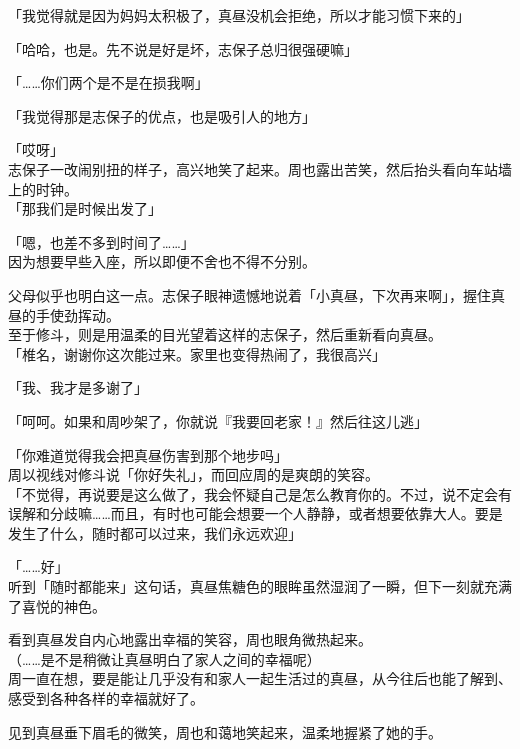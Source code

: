 「我觉得就是因为妈妈太积极了，真昼没机会拒绝，所以才能习惯下来的」

「哈哈，也是。先不说是好是坏，志保子总归很强硬嘛」

「……你们两个是不是在损我啊」

「我觉得那是志保子的优点，也是吸引人的地方」

「哎呀」\\

志保子一改闹别扭的样子，高兴地笑了起来。周也露出苦笑，然后抬头看向车站墙上的时钟。\\

「那我们是时候出发了」

「嗯，也差不多到时间了……」\\

因为想要早些入座，所以即便不舍也不得不分别。

父母似乎也明白这一点。志保子眼神遗憾地说着「小真昼，下次再来啊」，握住真昼的手使劲挥动。\\

至于修斗，则是用温柔的目光望着这样的志保子，然后重新看向真昼。\\

「椎名，谢谢你这次能过来。家里也变得热闹了，我很高兴」

「我、我才是多谢了」

「呵呵。如果和周吵架了，你就说『我要回老家！』然后往这儿逃」

「你难道觉得我会把真昼伤害到那个地步吗」\\

周以视线对修斗说「你好失礼」，而回应周的是爽朗的笑容。\\

「不觉得，再说要是这么做了，我会怀疑自己是怎么教育你的。不过，说不定会有误解和分歧嘛……而且，有时也可能会想要一个人静静，或者想要依靠大人。要是发生了什么，随时都可以过来，我们永远欢迎」

「……好」\\

听到「随时都能来」这句话，真昼焦糖色的眼眸虽然湿润了一瞬，但下一刻就充满了喜悦的神色。

看到真昼发自内心地露出幸福的笑容，周也眼角微热起来。\\

（……是不是稍微让真昼明白了家人之间的幸福呢）\\

周一直在想，要是能让几乎没有和家人一起生活过的真昼，从今往后也能了解到、感受到各种各样的幸福就好了。

见到真昼垂下眉毛的微笑，周也和蔼地笑起来，温柔地握紧了她的手。
